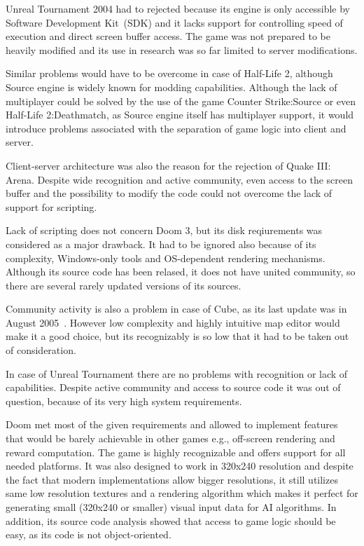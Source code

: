 \documentclass[english,bachelor,a4paper,twoside]{ppfcmthesis}
\begin{document}
Unreal Tournament 2004 had to rejected because its engine is only accessible by Software Development Kit~(SDK) and it lacks support for controlling speed of execution and direct screen buffer access.
The game was not prepared to be heavily modified and its use in research was so far limited to server modifications.

Similar problems would have to be overcome in case of Half-Life 2, although Source engine is widely known for modding capabilities.
Although the lack of multiplayer could be solved by the use of the game Counter Strike:Source or even Half-Life 2:Deathmatch, as Source engine itself has multiplayer support, it would introduce problems associated with the separation of game logic into client and server.

Client-server architecture was also the reason for the rejection of Quake III: Arena.
Despite wide recognition and active community, even access to the screen buffer and the possibility to modify the code could not overcome the lack of support for scripting.

Lack of scripting does not concern Doom 3, but its disk reqiurements was considered as a major drawback.
It had to be ignored also because of its complexity, Windows-only tools and OS-dependent rendering mechanisms.
Although its source code has been relased, it does not have united community, so there are several rarely updated versions of its sources.

Community activity is also a problem in case of Cube, as its last update was in August 2005~\cite{cube}.
However low complexity and highly intuitive map editor would make it a good choice, but its recognizably is so low that it had to be taken out of consideration. 

In case of Unreal Tournament there are no problems with recognition or lack of capabilities.
Despite active community and access to source code it was out of question, because of its very high system requirements.





Doom met most of the given requirements and allowed to implement features that would be barely achievable in other games e.g., off-screen rendering and reward computation.
The game is highly recognizable and offers support for all needed platforms.
It was also designed to work in 320x240 resolution and despite the fact that modern implementations allow bigger resolutions, it still utilizes same low resolution textures and a rendering algorithm which makes it perfect for generating small (320x240 or smaller) visual input data for AI algorithms.
In addition, its source code analysis showed that access to game logic should be easy, as its code is not object-oriented.
\end{document}
